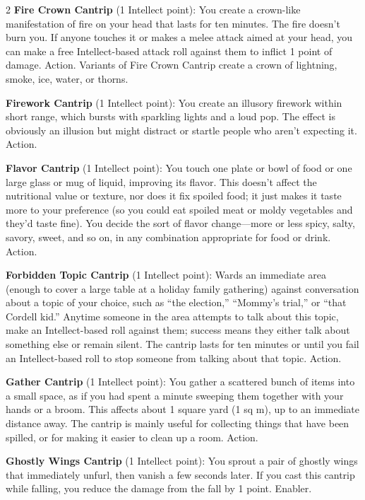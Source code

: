 \begin{multicols}{2}
\textbf{Fire Crown Cantrip} (1 Intellect point): You create a crown-like manifestation of fire on your head that lasts for ten minutes. The fire doesn’t burn you. If anyone touches it or makes a melee attack aimed at your head, you can make a free Intellect-based attack roll against them to inflict 1 point of damage. Action.
	Variants of Fire Crown Cantrip create a crown of lightning, smoke, ice, water, or thorns.

\textbf{Firework Cantrip} (1 Intellect point): You create an illusory firework within short range, which bursts with sparkling lights and a loud pop. The effect is obviously an illusion but might distract or startle people who aren’t expecting it. Action.

\textbf{Flavor Cantrip} (1 Intellect point): You touch one plate or bowl of food or one large glass or mug of liquid, improving its flavor. This doesn’t affect the nutritional value or texture, nor does it fix spoiled food; it just makes it taste more to your preference (so you could eat spoiled meat or moldy vegetables and they’d taste fine). You decide the sort of flavor change—more or less spicy, salty, savory, sweet, and so on, in any combination appropriate for food or drink. Action. 

\textbf{Forbidden Topic Cantrip} (1 Intellect point): Wards an immediate area (enough to cover a large table at a holiday family gathering) against conversation about a topic of your choice, such as “the election,” “Mommy’s trial,” or “that Cordell kid.” Anytime someone in the area attempts to talk about this topic, make an Intellect-based roll against them; success means they either talk about something else or remain silent. The cantrip lasts for ten minutes or until you fail an Intellect-based roll to stop someone from talking about that topic. Action. 

\textbf{Gather Cantrip} (1 Intellect point): You gather a scattered bunch of items into a small space, as if you had spent a minute sweeping them together with your hands or a broom. This affects about 1 square yard (1 sq m), up to an immediate distance away. The cantrip is mainly useful for collecting things that have been spilled, or for making it easier to clean up a room. Action. 

\textbf{Ghostly Wings Cantrip} (1 Intellect point): You sprout a pair of ghostly wings that immediately unfurl, then vanish a few seconds later. If you cast this cantrip while falling, you reduce the damage from the fall by 1 point. Enabler. 


\end{multicols}
